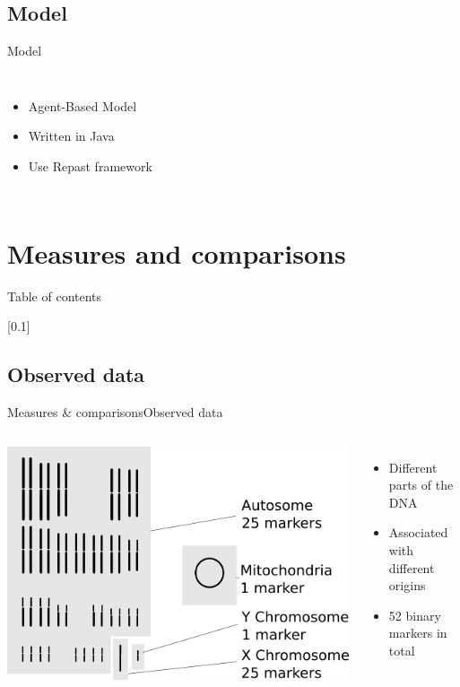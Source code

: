 \documentclass[10pt,aspectratio=43]{beamer}
\begin{document}
\subsection{Model}
\begin{frame}{}{Model}
\begin{columns}

  \begin{itemize}
    \item Agent-Based Model
    \item Written in Java
    \item Use Repast framework
  \end{itemize}

\end{columns}
\end{frame}


\section{Measures and comparisons}
\begin{frame}{}{Table of contents}
\tableofcontents[currentsection, subsectionstyle=show/show/hide]
\end{frame}

[0.1]{}{}{}
\subsection{Observed data}
\begin{frame}{Measures \& comparisons}{Observed data}
\begin{columns}
  \includegraphics[width=1\textwidth]{../data/markers.png}

  \begin{itemize}
    \item Different parts of the DNA
    \item Associated with different origins
    \item 52 binary markers in total
  \end{itemize}

\end{columns}
\end{frame}
\end{document}
